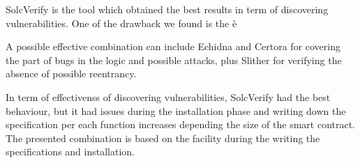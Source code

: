 SolcVerify is the tool which obtained the best results in term of discovering vulnerabilities. One of the drawback we found is the è

A possible effective combination can include Echidna and Certora for covering the part of bugs in the logic and possible attacks, 
plus Slither for verifying the absence of possible reentrancy. 

In term of effectivenss of discovering vulnerabilities, SolcVerify had the best behaviour, 
but it had issues during the installation phase and writing down the specification per each function increases depending the size of the smart contract.
The presented combination is based on the facility during the writing the specifications and installation.


